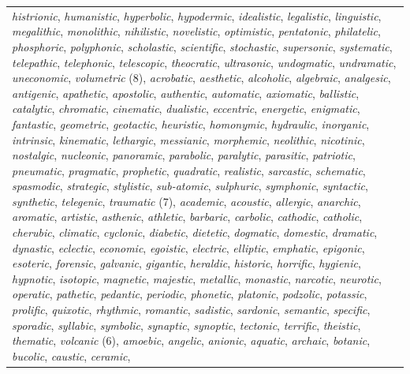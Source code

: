 \begin{table}
\begin{tabularx}{\textwidth}{Q}
\textit{histrionic}, \textit{humanistic}, \textit{hyperbolic}, \textit{hypodermic}, \textit{idealistic}, \textit{legalistic}, \textit{linguistic}, \textit{megalithic}, \textit{monolithic}, \textit{nihilistic}, \textit{novelistic}, \textit{optimistic}, \textit{pentatonic}, \textit{philatelic}, \textit{phosphoric}, \textit{polyphonic}, \textit{scholastic}, \textit{scientific}, \textit{stochastic}, \textit{supersonic}, \textit{systematic}, \textit{telepathic}, \textit{telephonic}, \textit{telescopic}, \textit{theocratic}, \textit{ultrasonic}, \textit{undogmatic}, \textit{undramatic}, \textit{uneconomic}, \textit{volumetric} (8), \textit{acrobatic}, \textit{aesthetic}, \textit{alcoholic}, \textit{algebraic}, \textit{analgesic}, \textit{antigenic}, \textit{apathetic}, \textit{apostolic}, \textit{authentic}, \textit{automatic}, \textit{axiomatic}, \textit{ballistic}, \textit{catalytic}, \textit{chromatic}, \textit{cinematic}, \textit{dualistic}, \textit{eccentric}, \textit{energetic}, \textit{enigmatic}, \textit{fantastic}, \textit{geometric}, \textit{geotactic}, \textit{heuristic}, \textit{homonymic}, \textit{hydraulic}, \textit{inorganic}, \textit{intrinsic}, \textit{kinematic}, \textit{lethargic}, \textit{messianic}, \textit{morphemic}, \textit{neolithic}, \textit{nicotinic}, \textit{nostalgic}, \textit{nucleonic}, \textit{panoramic}, \textit{parabolic}, \textit{paralytic}, \textit{parasitic}, \textit{patriotic}, \textit{pneumatic}, \textit{pragmatic}, \textit{prophetic}, \textit{quadratic}, \textit{realistic}, \textit{sarcastic}, \textit{schematic}, \textit{spasmodic}, \textit{strategic}, \textit{stylistic}, \textit{sub-atomic}, \textit{sulphuric}, \textit{symphonic}, \textit{syntactic}, \textit{synthetic}, \textit{telegenic}, \textit{traumatic} (7), \textit{academic}, \textit{acoustic}, \textit{allergic}, \textit{anarchic}, \textit{aromatic}, \textit{artistic}, \textit{asthenic}, \textit{athletic}, \textit{barbaric}, \textit{carbolic}, \textit{cathodic}, \textit{catholic}, \textit{cherubic}, \textit{climatic}, \textit{cyclonic}, \textit{diabetic}, \textit{dietetic}, \textit{dogmatic}, \textit{domestic}, \textit{dramatic}, \textit{dynastic}, \textit{eclectic}, \textit{economic}, \textit{egoistic}, \textit{electric}, \textit{elliptic}, \textit{emphatic}, \textit{epigonic}, \textit{esoteric}, \textit{forensic}, \textit{galvanic}, \textit{gigantic}, \textit{heraldic}, \textit{historic}, \textit{horrific}, \textit{hygienic}, \textit{hypnotic}, \textit{isotopic}, \textit{magnetic}, \textit{majestic}, \textit{metallic}, \textit{monastic}, \textit{narcotic}, \textit{neurotic}, \textit{operatic}, \textit{pathetic}, \textit{pedantic}, \textit{periodic}, \textit{phonetic}, \textit{platonic}, \textit{podzolic}, \textit{potassic}, \textit{prolific}, \textit{quixotic}, \textit{rhythmic}, \textit{romantic}, \textit{sadistic}, \textit{sardonic}, \textit{semantic}, \textit{specific}, \textit{sporadic}, \textit{syllabic}, \textit{symbolic}, \textit{synaptic}, \textit{synoptic}, \textit{tectonic}, \textit{terrific}, \textit{theistic}, \textit{thematic}, \textit{volcanic} (6), \textit{amoebic}, \textit{angelic}, \textit{anionic}, \textit{aquatic}, \textit{archaic}, \textit{botanic}, \textit{bucolic}, \textit{caustic}, \textit{ceramic}, 
\end{tabularx}
\end{table}
